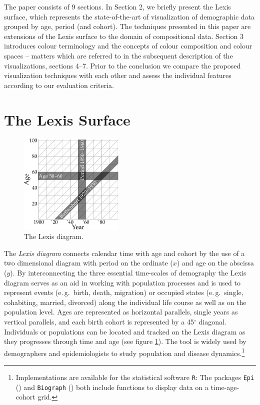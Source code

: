 \documentclass[a4paper]{scrartcl}
\begin{document}
The paper consists of 9 sections. In Section 2, we briefly present the Lexis surface, which represents the state-of-the-art of visualization of demographic data grouped by age, period (and cohort). The techniques presented in this paper are extensions of the Lexis surface to the domain of compositional data. Section 3 introduces colour terminology and the concepts of colour composition and colour spaces -- matters which are referred to in the subsequent description of the visualizations, sections 4--7. Prior to the conclusion we compare the proposed visualization techniques with each other and assess the individual features according to our evaluation criteria.

\section*{The Lexis Surface}

\begin{figure}
  \centering
  \includegraphics[width = 5cm]{../fig/plot-lexis_exmpl.pdf}
  \caption{The Lexis diagram.}
  \label{fig:lexis_exmpl}
\end{figure}

The \emph{Lexis diagram} connects calendar time with age and cohort by the use of a two dimensional diagram with period on the ordinate ($x$) and age on the abscissa ($y$). By interconnecting the three essential time-scales of demography the Lexis diagram serves as an aid in working with population processes and is used to represent events (e.\,g.~birth, death, migration) or occupied states (e.\,g.~single, cohabiting, married, divorced) along the individual life course as well as on the population level. Ages are represented as horizontal parallels, single years as vertical parallels, and each birth cohort is represented by a 45$^\circ$ diagonal. Individuals or populations can be located and tracked on the Lexis diagram as they progresses through time and age (see figure \ref{fig:lexis_exmpl}). The tool is widely used by demographers and epidemiologists to study population and disease dynamics.\footnote{Implementations are available for the statistical software \texttt{R}: The packages \texttt{Epi} (\cite{Carstensen2014}) and \texttt{Biograph} (\cite{Willekens2013b}) both include functions to display data on a time-age-cohort grid.}
\end{document}
